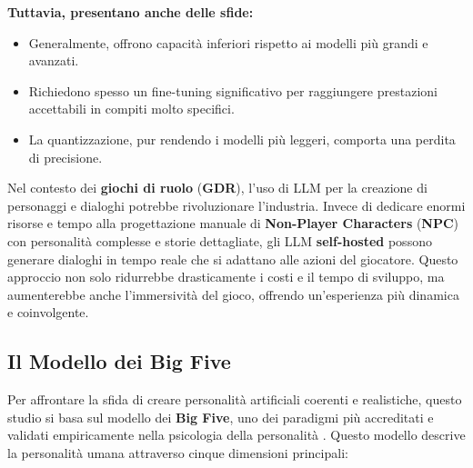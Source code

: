 \textbf{Tuttavia, presentano anche delle sfide:}
\begin{itemize}
\item Generalmente, offrono capacità inferiori rispetto ai modelli più grandi e avanzati.
\item Richiedono spesso un fine-tuning significativo per raggiungere prestazioni accettabili in compiti molto specifici.
\item La quantizzazione, pur rendendo i modelli più leggeri, comporta una perdita di precisione.
\end{itemize}
Nel contesto dei \textbf{giochi di ruolo} (\textbf{GDR}), l'uso di LLM per la creazione di personaggi e dialoghi potrebbe rivoluzionare l'industria. Invece di dedicare enormi risorse e tempo alla progettazione manuale di \textbf{Non-Player Characters} (\textbf{NPC}) con personalità complesse e storie dettagliate, gli LLM \textbf{self-hosted} possono generare dialoghi in tempo reale che si adattano alle azioni del giocatore. Questo approccio non solo ridurrebbe drasticamente i costi e il tempo di sviluppo, ma aumenterebbe anche l'immersività del gioco, offrendo un'esperienza più dinamica e coinvolgente.

\subsection{Il Modello dei Big Five}

Per affrontare la sfida di creare personalità artificiali coerenti e realistiche, questo studio si basa sul modello dei \textbf{Big Five}, uno dei paradigmi più accreditati e validati empiricamente nella psicologia della personalità \cite{smith1996goldberg}. Questo modello descrive la personalità umana attraverso cinque dimensioni principali:


